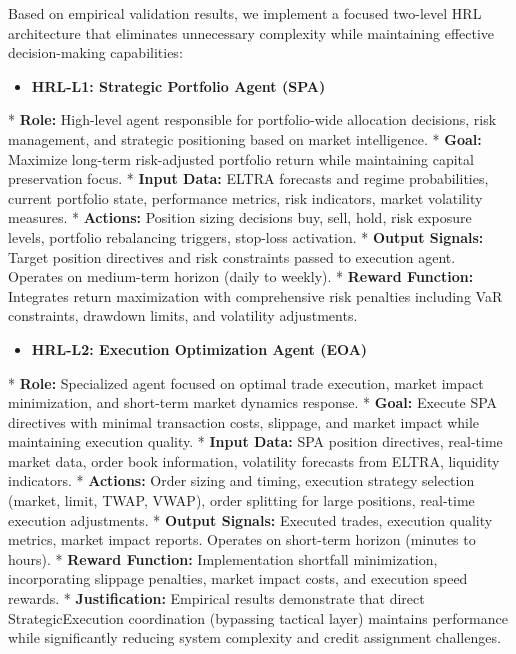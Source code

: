 \documentclass[11pt]{article}
\begin{document}
Based on empirical validation results, we implement a focused two-level HRL architecture that eliminates unnecessary complexity while maintaining effective decision-making capabilities:

\begin{itemize}
\item   \textbf{HRL-L1: Strategic Portfolio Agent (SPA)}
\end{itemize}
    *   \textbf{Role:} High-level agent responsible for portfolio-wide allocation decisions, risk management, and strategic positioning based on market intelligence.
    *   \textbf{Goal:} Maximize long-term risk-adjusted portfolio return while maintaining capital preservation focus.
    *   \textbf{Input Data:} ELTRA forecasts and regime probabilities, current portfolio state, performance metrics, risk indicators, market volatility measures.
    *   \textbf{Actions:} Position sizing decisions {buy, sell, hold}, risk exposure levels, portfolio rebalancing triggers, stop-loss activation.
    *   \textbf{Output Signals:} Target position directives and risk constraints passed to execution agent. Operates on medium-term horizon (daily to weekly).
    *   \textbf{Reward Function:} Integrates return maximization with comprehensive risk penalties including VaR constraints, drawdown limits, and volatility adjustments.
\begin{itemize}
\item   \textbf{HRL-L2: Execution Optimization Agent (EOA)}
\end{itemize}
    *   \textbf{Role:} Specialized agent focused on optimal trade execution, market impact minimization, and short-term market dynamics response.
    *   \textbf{Goal:} Execute SPA directives with minimal transaction costs, slippage, and market impact while maintaining execution quality.
    *   \textbf{Input Data:} SPA position directives, real-time market data, order book information, volatility forecasts from ELTRA, liquidity indicators.
    *   \textbf{Actions:} Order sizing and timing, execution strategy selection (market, limit, TWAP, VWAP), order splitting for large positions, real-time execution adjustments.
    *   \textbf{Output Signals:} Executed trades, execution quality metrics, market impact reports. Operates on short-term horizon (minutes to hours).
    *   \textbf{Reward Function:} Implementation shortfall minimization, incorporating slippage penalties, market impact costs, and execution speed rewards.
    *   \textbf{Justification:} Empirical results demonstrate that direct StrategicExecution coordination (bypassing tactical layer) maintains performance while significantly reducing system complexity and credit assignment challenges.
\end{document}
